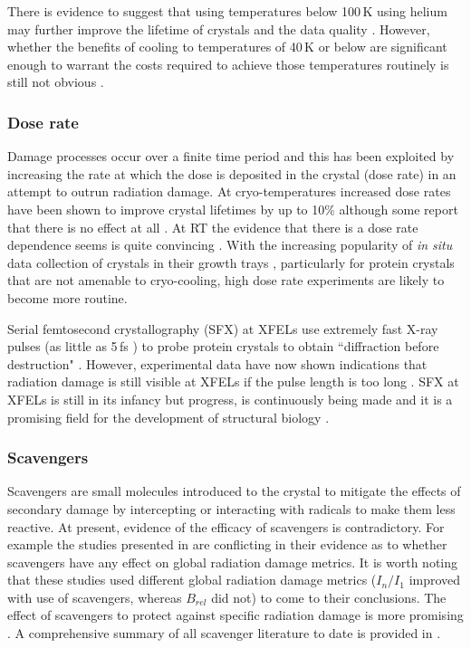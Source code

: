             There is evidence to suggest that using temperatures below 100\,K using helium may further improve the lifetime of crystals and the data quality \cite{meents2010,teng2002}.
            However, whether the benefits of cooling to temperatures of 40\,K or below are significant enough to warrant the costs required to achieve those temperatures routinely is still not obvious \cite{weik2010temperature}.

        \subsubsection{Dose rate}
        \label{subs:Dose rate}
            Damage processes occur over a finite time period and this has been exploited by increasing the rate at which the dose is deposited in the crystal (dose rate) in an attempt to outrun radiation damage.
			At cryo-temperatures increased dose rates have been shown to improve crystal lifetimes by up to 10\% \cite{owen2006} although some report that there is no effect at all \cite{sliz2003}.
			At RT the evidence that there is a dose rate dependence seems is quite convincing \cite{south2007,owen2012,owen2014}.
			With the increasing popularity of \textit{in situ} data collection of crystals in their growth trays \cite{axford2015structure,axford2012situ}, particularly for protein crystals that are not amenable to cryo-cooling, high dose rate experiments are likely to become more routine.

            Serial femtosecond crystallography (SFX) at XFELs use extremely fast X-ray pulses (as little as 5\,fs \cite{boutet2012high}) to probe protein crystals to obtain ``diffraction before destruction" \cite{chapman2014diffraction}.
			However, experimental data have now shown indications that radiation damage is still visible at XFELs if the pulse length is too long \cite{nass2015indications}.
			SFX at XFELs is still in its infancy but progress, is continuously being made and it is a promising field for the development of structural biology \cite{garman2014,brooks2015nobel}.


        \subsubsection{Scavengers}
        \label{subs:Scavengers}
            Scavengers are small molecules introduced to the crystal to mitigate the effects of secondary damage by intercepting or interacting with radicals to make them less reactive.
			At present, evidence of the efficacy of scavengers is contradictory.
			For example the studies presented in \cite{barker2009room,kmetko2011can} are conflicting in their evidence as to whether scavengers have any effect on global radiation damage metrics.
			It is worth noting that these studies used different global radiation damage metrics ($I_n/I_1$ improved with use of scavengers, whereas $B_{rel}$ did not) to come to their conclusions.
			The effect of scavengers to protect against specific radiation damage is more promising \cite{southworth2007radioprotectant}.
			A comprehensive summary of all scavenger literature to date is provided in \cite{allan2012}.


